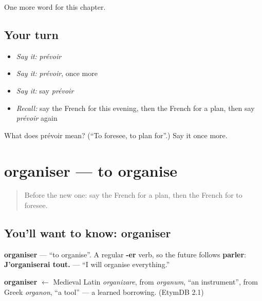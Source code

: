 \begin{grammarlens}[title={What you've built}]
One more word for this chapter.
\end{grammarlens}

\subsection*{Your turn}
\begin{itemize}
\raggedright
  \item \emph{Say it:} \emph{prévoir}
  \item \emph{Say it:} \emph{prévoir}, once more
  \item \emph{Say it:} say \emph{prévoir}
  \item \emph{Recall:} say the French for this evening, then the French for a plan, then say \emph{prévoir} again
\end{itemize}

\begin{tcolorbox}[breakable,colback=teal!4,colframe=teal!35!black,title={Before you move on}]
What does prévoir mean? (\textquotedblleft{}To foresee, to plan for\textquotedblright{}.) Say it once more.
\end{tcolorbox}
\section[organiser]{organiser — to organise}

\label{lesson:FR-C141-organiser}



\begin{quote}
Before the new one: say the French for a plan, then the French for to foresee.
\end{quote}

\subsection*{You'll want to know: organiser}
\textbf{organiser} — \textquotedblleft{}to organise\textquotedblright{}. A regular \textbf{-er} verb, so the future follows \textbf{parler}: \textbf{J'organiserai tout.} — \textquotedblleft{}I will organise everything.\textquotedblright{}

\begin{cousinweb}
\textbf{organiser} $\leftarrow$ Medieval Latin \emph{organizare}, from \emph{organum}, \textquotedblleft{}an instrument\textquotedblright{}, from Greek \emph{organon}, \textquotedblleft{}a tool\textquotedblright{} — a learned borrowing. (EtymDB 2.1)
\end{cousinweb}

